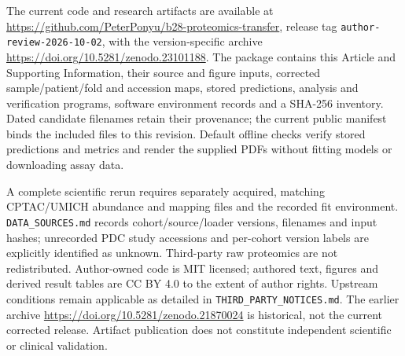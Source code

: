 The current code and research artifacts are available at
\url{https://github.com/PeterPonyu/b28-proteomics-transfer}, release tag
\texttt{author-review-2026-10-02}, with the version-specific archive
\url{https://doi.org/10.5281/zenodo.23101188}. The package contains this
Article and Supporting Information, their source and figure inputs,
corrected sample/patient/fold and accession maps, stored predictions,
analysis and verification programs, software environment records and a
SHA-256 inventory. Dated candidate filenames retain their provenance;
the current public manifest binds the included files to this revision.
Default offline checks verify stored predictions and metrics and render
the supplied PDFs without fitting models or downloading assay data.

A complete scientific rerun requires separately acquired, matching
CPTAC/UMICH abundance and mapping files and the recorded fit environment.
\texttt{DATA\_SOURCES.md} records cohort/source/loader versions, filenames
and input hashes; unrecorded PDC study accessions and per-cohort version
labels are explicitly identified as unknown. Third-party raw proteomics
are not redistributed. Author-owned code is MIT licensed; authored text,
figures and derived result tables are CC BY 4.0 to the extent of author
rights. Upstream conditions remain applicable as detailed in
\texttt{THIRD\_PARTY\_NOTICES.md}. The earlier archive
\url{https://doi.org/10.5281/zenodo.21870024} is historical, not the
current corrected release. Artifact publication does not constitute
independent scientific or clinical validation.
